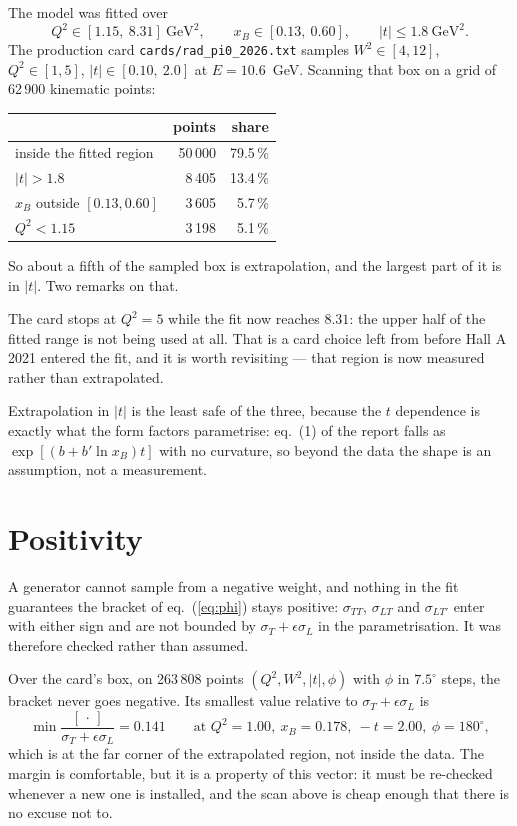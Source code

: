 \documentclass[11pt,a4paper]{article}
\newcommand{\sig}[1]{\sigma_{#1}}
\newcommand{\code}[1]{\texttt{#1}}
\begin{document}
The model was fitted over
\[
Q^2 \in [1.15,\ 8.31]\ \mathrm{GeV}^2,\qquad
x_B \in [0.13,\ 0.60],\qquad
|t| \le 1.8\ \mathrm{GeV}^2 .
\]
The production card \code{cards/rad\_pi0\_2026.txt} samples $W^2 \in [4,12]$,
$Q^2 \in [1,5]$, $|t| \in [0.10,\ 2.0]$ at $E = 10.6$~GeV.  Scanning that box on
a grid of 62\,900 kinematic points:

\begin{center}
\begin{tabular}{lrr}
\toprule
 & points & share\\
\midrule
inside the fitted region & 50\,000 & 79.5\,\%\\
$|t| > 1.8$ & 8\,405 & 13.4\,\%\\
$x_B$ outside $[0.13, 0.60]$ & 3\,605 & 5.7\,\%\\
$Q^2 < 1.15$ & 3\,198 & 5.1\,\%\\
\bottomrule
\end{tabular}
\end{center}

\noindent
So about a fifth of the sampled box is extrapolation, and the largest part of it
is in $|t|$.  Two remarks on that.

The card stops at $Q^2 = 5$ while the fit now reaches $8.31$: the upper half of
the fitted range is not being used at all.  That is a card choice left from
before Hall A 2021 entered the fit, and it is worth revisiting --- that region is
now measured rather than extrapolated.

Extrapolation in $|t|$ is the least safe of the three, because the $t$
dependence is exactly what the form factors parametrise: eq.~(1) of the report
falls as $\exp[(b + b'\ln x_B)t]$ with no curvature, so beyond the data the
shape is an assumption, not a measurement.

\section{Positivity}

A generator cannot sample from a negative weight, and nothing in the fit
guarantees the bracket of eq.~(\ref{eq:phi}) stays positive: $\sig{TT}$,
$\sig{LT}$ and $\sig{LT'}$ enter with either sign and are not bounded by
$\sig{T}+\epsilon\sig{L}$ in the parametrisation.  It was therefore checked
rather than assumed.

Over the card's box, on 263\,808 points $(Q^2, W^2, |t|, \phi)$ with $\phi$ in
$7.5^\circ$ steps, the bracket never goes negative.  Its smallest value relative
to $\sig{T}+\epsilon\sig{L}$ is
\[
\min \frac{[\,\cdot\,]}{\sig{T}+\epsilon\sig{L}} = 0.141
\qquad\text{at } Q^2 = 1.00,\ x_B = 0.178,\ -t = 2.00,\ \phi = 180^\circ ,
\]
which is at the far corner of the extrapolated region, not inside the data.  The
margin is comfortable, but it is a property of this vector: it must be re-checked
whenever a new one is installed, and the scan above is cheap enough that there is
no excuse not to.
\end{document}
